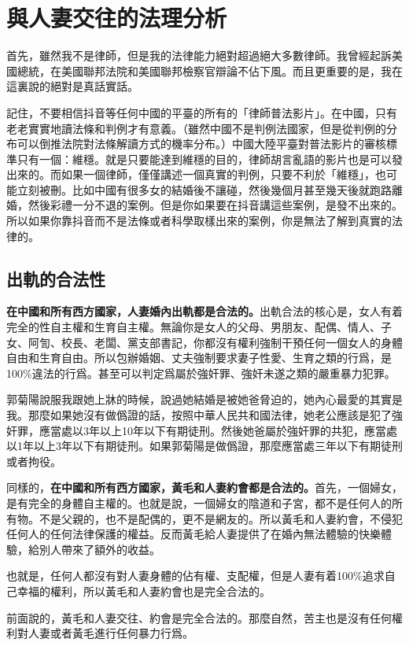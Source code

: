 \section{與人妻交往的法理分析}

首先，雖然我不是律師，但是我的法律能力絕對超過絕大多數律師。我曾經起訴美國總統，在美國聯邦法院和美國聯邦檢察官辯論不佔下風。而且更重要的是，我在這裏說的絕對是真話實話。

記住，不要相信抖音等任何中國的平臺的所有的「律師普法影片」。在中國，只有老老實實地讀法條和判例才有意義。（雖然中國不是判例法國家，但是從判例的分布可以倒推法院對法條解讀方式的機率分布。）中國大陸平臺對普法影片的審核標準只有一個：維穩。就是只要能達到維穩的目的，律師胡言亂語的影片也是可以發出來的。而如果一個律師，僅僅講述一個真實的判例，只要不利於「維穩」，也可能立刻被刪。比如中國有很多女的結婚後不讓碰，然後幾個月甚至幾天後就跑路離婚，然後彩禮一分不退的案例。但是你如果要在抖音講這些案例，是發不出來的。所以如果你靠抖音而不是法條或者科學取樣出來的案例，你是無法了解到真實的法律的。

\subsection{出軌的合法性}

\textbf{在中國和所有西方國家，人妻婚內出軌都是合法的。}出軌合法的核心是，女人有着完全的性自主權和生育自主權。無論你是女人的父母、男朋友、配偶、情人、子女、阿訇、校長、老闆、黨支部書記，你都沒有權利強制干預任何一個女人的身體自由和生育自由。所以包辦婚姻、丈夫強制要求妻子性愛、生育之類的行爲，是100\%違法的行爲。甚至可以判定爲屬於強奸罪、強奸未遂之類的嚴重暴力犯罪。

郭菊陽說服我跟她上牀的時候，說過她結婚是被她爸脅迫的，她內心最愛的其實是我。那麼如果她沒有做僞證的話，按照中華人民共和國法律，她老公應該是犯了強奸罪，應當處以3年以上10年以下有期徒刑。然後她爸屬於強奸罪的共犯，應當處以1年以上3年以下有期徒刑。如果郭菊陽是做僞證，那麼應當處三年以下有期徒刑或者拘役。

同樣的，\textbf{在中國和所有西方國家，黃毛和人妻約會都是合法的。}首先，一個婦女，是有完全的身體自主權的。也就是說，一個婦女的陰道和子宮，都不是任何人的所有物。不是父親的，也不是配偶的，更不是網友的。所以黃毛和人妻約會，不侵犯任何人的任何法律保護的權益。反而黃毛給人妻提供了在婚內無法體驗的快樂體驗，給別人帶來了額外的收益。

也就是，任何人都沒有對人妻身體的佔有權、支配權，但是人妻有着100\%追求自己幸福的權利，所以黃毛和人妻約會也是完全合法的。

前面說的，黃毛和人妻交往、約會是完全合法的。那麼自然，苦主也是沒有任何權利對人妻或者黃毛進行任何暴力行爲。


